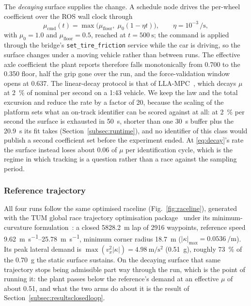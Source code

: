 The \emph{decaying} surface supplies the change. A schedule node drives the
per-wheel coefficient over the ROS wall clock through
\begin{equation}
\mu_{\mathrm{cmd}}(t)=\max\!\big(\mu_{\mathrm{floor}},\;\mu_{0}(1-\eta t)\big),
\qquad \eta=10^{-3}\,\si{\per\second},
\label{eq:decay}
\end{equation}
with $\mu_{0}=\num{1.0}$ and $\mu_{\mathrm{floor}}=\num{0.5}$, reached at
$t=\SI{500}{\second}$; the command is applied through the bridge's
\texttt{set\_tire\_friction} service while the car is driving, so the surface
changes under a moving vehicle rather than between runs. The effective axle
coefficient the plant reports therefore falls monotonically from \num{0.700} to
the \num{0.350} floor, half the grip gone over the run, and the force-validation
window opens at \num{0.637}. The linear-decay protocol is that of
LLA-MPC~\cite{llampc2025}, which decays $\mu$ at \SI{2}{\percent} of nominal per
second on a 1:43 vehicle. We keep the law and the total excursion and reduce the
rate by a factor of \num{20}, because the scaling of the platform sets what an
on-track identifier can be scored against at all: at \SI{2}{\percent} per second
the surface is exhausted in \SI{50}{\second}, shorter than one
\SI{30}{\second} buffer plus the \SI{20.9}{\second} its fit takes
(Section~\ref{subsec:runtime}), and no identifier of this class would publish a
second coefficient set before the experiment ended. At \eqref{eq:decay}'s rate
the surface instead loses about \num{0.06} of $\mu$ per identification cycle,
which is the regime in which tracking is a question rather than a race against
the sampling period.

\subsubsection{Reference trajectory}
\label{subsubsec:raceline}
All four runs follow the same optimised raceline (Fig.~\ref{fig:raceline}),
generated with the TUM global race trajectory optimisation
package~\cite{tumracetraj} under its minimum-curvature
formulation~\cite{heilmeier2020}: a closed \SI{5828.2}{\meter} lap of
\num{2916} waypoints, reference speed
\SIrange{9.62}{25.78}{\meter\per\second}, minimum corner radius
\SI{18.7}{\meter} ($|\kappa|_{\max}=\SI{0.0536}{\per\meter}$). Its peak lateral
demand is $\max(v_{x}^{2}|\kappa|)=\SI{4.98}{\meter\per\second\squared}$
(\SI{0.51}{\g}), roughly \SI{73}{\percent} of the \SI{0.70}{\g} the static
surface sustains. On the decaying surface that same trajectory stops being
admissible part way through the run, which is the point of running it: the
plant passes below the reference's demand at an effective $\mu$ of about
\num{0.51}, and what the two arms do about it is the result of
Section~\ref{subsec:resultsclosedloop}.


